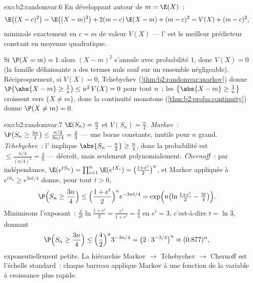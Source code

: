 \begin{solution}{exo:b2:randomvar:6}
En développant autour de $m = \E(X)$~:
\[
\E\bigl((X - c)^2\bigr)
= \E\bigl((X - m)^2\bigr) + 2(m - c)\,\E(X - m) + (m - c)^2
= V(X) + (m - c)^2 ,
\]
minimale exactement en $c = m$ de valeur $V(X)$ --- l' est
le meilleur prédicteur constant en moyenne quadratique.

Si $\P(X = m) = 1$ alors $(X - m)^2$ s'annule avec probabilité
$1$, donc $V(X) = 0$ (la famille définissante a des termes nuls sauf sur un
ensemble négligeable). Réciproquement, si $V(X) = 0$, Tchebychev
(\cref{thm:b2:randomvar:markov}) donne $\P\bigl(\abs{X - m} \geq
\frac1n\bigr) \leq n^2\,V(X) = 0$ pour tout $n$~; les 
$\bigl\{\abs{X - m} \geq \frac1n\bigr\}$ croissent vers $\{X \neq
m\}$, donc la continuité monotone (\cref{thm:b2:proba:continuity})
donne $\P(X \neq m) = 0$.
\end{solution}

\begin{solution}{exo:b2:randomvar:7}
$\E(S_n) = \frac n2$ et $V(S_n) = \frac n4$.
\emph{Markov~:} $\P\bigl(S_n \geq \frac{3n}4\bigr) \leq
\frac{n/2}{3n/4} = \frac23$ --- une borne constante, inutile pour
$n$ grand.
\emph{Tchebychev~:} l' implique $\abs{S_n - \frac n2} \geq
\frac n4$, donc la probabilité est $\leq \frac{n/4}{(n/4)^2} =
\frac4n$ --- décroît, mais seulement polynomialement.
\emph{Chernoff~:} par indépendance, $\E(e^{tS_n}) =
\prod_{i=1}^n\E(e^{tX_i}) = \bigl(\frac{1 + e^t}{2}\bigr)^n$, et
Markov appliquée à $e^{tS_n} \geq e^{3nt/4}$ donne, pour tout $t >
0$,
\[
\P\Bigl(S_n \geq \frac{3n}4\Bigr)
\leq \Bigl(\frac{1 + e^t}{2}\Bigr)^n e^{-3nt/4}
= \exp\Bigl(n\bigl(\ln\tfrac{1 + e^t}{2} - \tfrac{3t}4\bigr)\Bigr).
\]
Minimisons l'exposant~: $\frac{\dd}{\dd t}\ln\frac{1+e^t}{2} =
\frac{e^t}{1 + e^t} = \frac34$ en $e^t = 3$, c'est-à-dire $t = \ln 3$,
donnant
\[
\P\Bigl(S_n \geq \frac{3n}4\Bigr)
\leq \Bigl(\frac{4}{2}\Bigr)^n 3^{-3n/4}
= \bigl(2 \cdot 3^{-3/4}\bigr)^n \approx (0.877)^n ,
\]
exponentiellement petite. La hiérarchie Markov $\to$ Tchebychev $\to$
Chernoff est l'échelle standard~: chaque barreau applique Markov à une
fonction de la variable à croissance plus rapide.
\end{solution}

